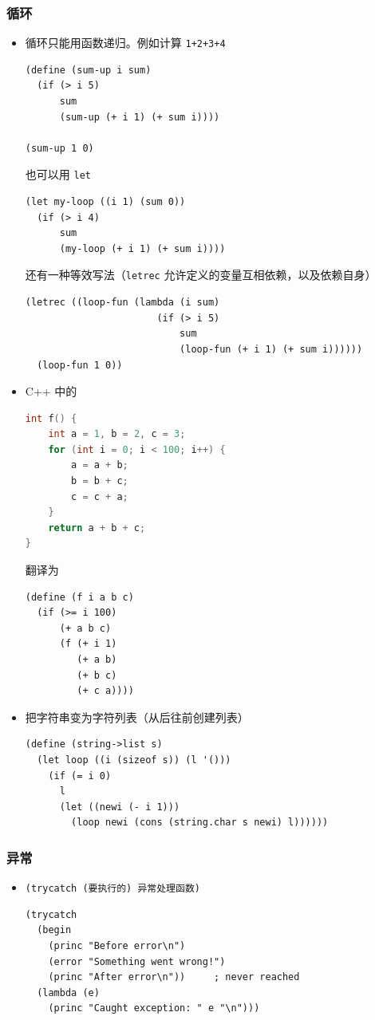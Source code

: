 \subsubsection{循环}
\begin{itemize}
\item 循环只能用函数递归。例如计算 \verb`1+2+3+4`
\begin{lstlisting}[language=none]
(define (sum-up i sum)
  (if (> i 5)
      sum
      (sum-up (+ i 1) (+ sum i))))

(sum-up 1 0)
\end{lstlisting}
也可以用 \verb`let`
\begin{lstlisting}[language=none]
(let my-loop ((i 1) (sum 0))
  (if (> i 4)
      sum
      (my-loop (+ i 1) (+ sum i))))
\end{lstlisting}
还有一种等效写法（\verb`letrec` 允许定义的变量互相依赖，以及依赖自身）
\begin{lstlisting}[language=none]
(letrec ((loop-fun (lambda (i sum)
                       (if (> i 5)
                           sum
                           (loop-fun (+ i 1) (+ sum i))))))
  (loop-fun 1 0))
\end{lstlisting}

\item C++ 中的
\begin{lstlisting}[language=cpp]
int f() {
    int a = 1, b = 2, c = 3;
    for (int i = 0; i < 100; i++) {
        a = a + b;
        b = b + c;
        c = c + a;
    }
    return a + b + c;
}
\end{lstlisting}
翻译为
\begin{lstlisting}[language=none]
(define (f i a b c)
  (if (>= i 100)
      (+ a b c)
      (f (+ i 1)
         (+ a b)
         (+ b c)
         (+ c a))))
\end{lstlisting}

\item 把字符串变为字符列表（从后往前创建列表）
\begin{lstlisting}[language=none]
(define (string->list s)
  (let loop ((i (sizeof s)) (l '()))
    (if (= i 0)
	  l
	  (let ((newi (- i 1)))
	    (loop newi (cons (string.char s newi) l))))))
\end{lstlisting}
\end{itemize}

\subsubsection{异常}
\begin{itemize}
\item \verb`(trycatch (要执行的) 异常处理函数)`
\begin{lstlisting}[language=none]
(trycatch
  (begin
    (princ "Before error\n")
    (error "Something went wrong!")
    (princ "After error\n"))     ; never reached
  (lambda (e)
    (princ "Caught exception: " e "\n")))
\end{lstlisting}
\end{itemize}


